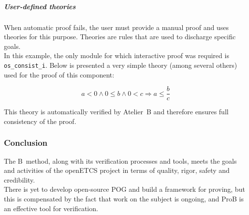 \subparagraph{User-defined theories}
When automatic proof fails, the user must provide a manual proof and uses theories for this purpose. Theories are rules that are used to discharge specific goals.\\
In this example, the only module for which interactive proof was required is \verb+os_consist_i+. Below is presented a very simple theory (among several others) used for the proof of this component:

\begin{equation}
\tag{User theory 1}
a < 0 \land 0 \leq b \land 0 < c \Rightarrow a \leq \frac{b}{c}
\end{equation}

This theory is automatically verified by Atelier~B and therefore ensures full consistency of the proof.


\subsubsection{Conclusion}
The B~method, along with its verification processes and tools, meets the goals and activities of the openETCS project in terms of quality, rigor, safety and credibility.\\
There is yet to develop open-source POG and build a framework for proving, but this is compensated by the fact that work on the subject is ongoing, and ProB is an effective tool for verification.


